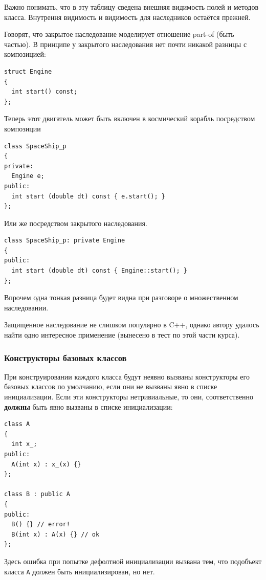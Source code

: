 \documentclass[a4paper,12pt,oneside]{article}
\begin{document}
Важно понимать, что в эту таблицу сведена внешняя видимость полей и методов класса. Внутрення видимость и видимость для наследников остаётся прежней.

Говорят, что закрытое наследование моделирует отношение part-of (быть частью). В принципе у закрытого наследования нет почти никакой разницы с композицией:

\begin{lstlisting}
struct Engine
{
  int start() const;
};
\end{lstlisting}

Теперь этот двигатель может быть включен в космический корабль посредством композиции

\begin{lstlisting}
class SpaceShip_p
{
private: 
  Engine e;
public:
  int start (double dt) const { e.start(); } 
};
\end{lstlisting}

Или же посредством закрытого наследования.

\begin{lstlisting}
class SpaceShip_p: private Engine
{
public:
  int start (double dt) const { Engine::start(); }
};
\end{lstlisting}

Впрочем одна тонкая разница будет видна при разговоре о множественном наследовании.

Защищенное наследование не слишком популярно в C++, однако автору удалось найти одно интересное применение (вынесено в тест по этой части курса).

\subsubsection{Конструкторы базовых классов}\label{BaseClassConstr}

При конструировании каждого класса будут неявно вызваны конструкторы его базовых классов по умолчанию, если они не вызваны явно в списке инициализации. Если эти конструкторы нетривиальные, то они, соответственно \textbf{должны} быть явно вызваны в списке инициализации:

\begin{lstlisting}
class A
{
  int x_;
public:
  A(int x) : x_(x) {}
};

class B : public A
{
public:
  B() {} // error!
  B(int x) : A(x) {} // ok
};
\end{lstlisting}

Здесь ошибка при попытке дефолтной инициализации вызвана тем, что подобъект класса \lstinline!A! должен быть инициализирован, но нет.
\end{document}

